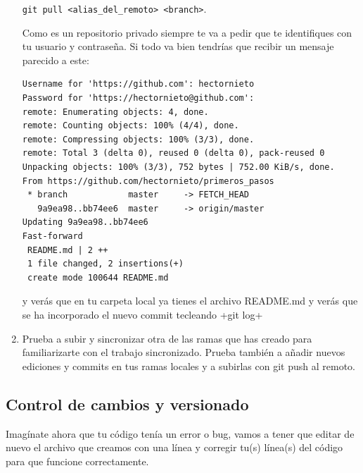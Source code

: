\documentclass[a5paper, oneside,10pt]{article}
\begin{document}
\begin{enumerate}
      \verb+git pull <alias_del_remoto> <branch>+. 
      
      Como es un repositorio privado siempre te va a pedir que te identifiques con tu usuario y contraseña. Si todo va bien tendrías que recibir un mensaje parecido a este:
      
      \begin{lstlisting}[style=custom]
Username for 'https://github.com': hectornieto
Password for 'https://hectornieto@github.com': 
remote: Enumerating objects: 4, done.
remote: Counting objects: 100% (4/4), done.
remote: Compressing objects: 100% (3/3), done.
remote: Total 3 (delta 0), reused 0 (delta 0), pack-reused 0
Unpacking objects: 100% (3/3), 752 bytes | 752.00 KiB/s, done.
From https://github.com/hectornieto/primeros_pasos
 * branch            master     -> FETCH_HEAD
   9a9ea98..bb74ee6  master     -> origin/master
Updating 9a9ea98..bb74ee6
Fast-forward
 README.md | 2 ++
 1 file changed, 2 insertions(+)
 create mode 100644 README.md
      \end{lstlisting}
      y verás que en tu carpeta local ya tienes el archivo README.md y verás que se ha incorporado el nuevo commit tecleando \cverb+git log+
      
      \item Prueba a subir y sincronizar otra de las ramas que has creado para familiarizarte con el trabajo sincronizado. Prueba también a añadir nuevos ediciones y commits en tus ramas locales y a subirlas con git push al remoto.
    \end{enumerate}
  
  \subsection{Control de cambios y versionado}
    Imagínate ahora que tu código tenía un error o bug, vamos a tener que editar de nuevo el archivo que creamos con una línea y corregir tu(s) línea(s) del código para que funcione correctamente. 
    
\end{document}
